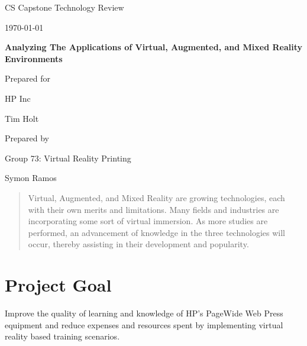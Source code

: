 \documentclass[onecolumn, draftclsnofoot,10pt, compsoc]{IEEEtran}
\def \CapstoneTeamName{		    Group 73: Virtual Reality Printing }
\def \GroupMemberOne{			Symon Ramos}
\def \CapstoneProjectName{		Analyzing The Applications of Virtual, Augmented, and Mixed Reality Environments}
\def \CapstoneSponsorCompany{	HP Inc}
\def \CapstoneSponsorPerson{		Tim Holt}
\def \DocType{		
				Technology Review
				}
\newcommand{\NameSigPair}[1]{\par
\makebox[2.75in][r]{#1} \hfil 	\makebox[3.25in]{\makebox[2.25in]{\hrulefill} \hfill		\makebox[.75in]{\hrulefill}}
\par\vspace{-12pt} \textit{\tiny\noindent
\makebox[2.75in]{} \hfil		\makebox[3.25in]{\makebox[2.25in][r]{Signature} \hfill	\makebox[.75in][r]{Date}}}}
\renewcommand{\NameSigPair}[1]{#1}
\begin{document}
\begin{titlepage}
    \begin{singlespace}
        \hfill 
        \par\vspace{.2in}
        \centering
        \scshape{
            \huge CS Capstone \DocType \par
            {\large\today}\par
            \vspace{.5in}
            \textbf{\Huge\CapstoneProjectName}\par
            \vfill
            {\large Prepared for}\par
            \Huge \CapstoneSponsorCompany\par
            \vspace{5pt}
            {\Large\NameSigPair{\CapstoneSponsorPerson}\par}
            {\large Prepared by }\par
            \CapstoneTeamName\par
            \vspace{5pt}
            {\Large
                \NameSigPair{\GroupMemberOne}\par
            }
            \vspace{20pt}
        }
        \begin{abstract}
            Virtual, Augmented, and Mixed Reality are growing technologies, each with their own merits and limitations. Many fields and industries are incorporating some sort of virtual immersion. As more studies are performed, an advancement of knowledge in the three technologies will occur, thereby assisting in their development and popularity.
        \end{abstract}  
    \end{singlespace}
\end{titlepage}
\newpage
{}
\tableofcontents
\newpage

\section {Project Goal}
 Improve the quality of learning and knowledge of HP's PageWide Web Press equipment and reduce expenses and resources spent by implementing virtual reality based training scenarios.
 
\end{document}
